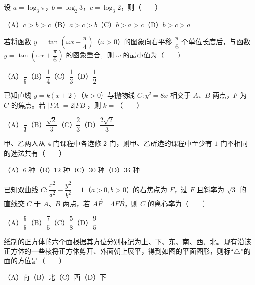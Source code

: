 \begin{question}
设 $a=\log_3\pi$，$b=\log_2 3$，$c=\log_3 2$，则\mbox{（　　）}

（A）$a>b>c$\quad（B）$a>c>b$\quad（C）$b>a>c$\quad（D）$b>c>a$

\end{question}
\begin{question}
若将函数 $y=\tan\left(\omega x+\dfrac\pi4\right)$（$\omega>0$）的图象向右平移 $\dfrac\pi6$ 个单位长度后，与函数 $y=\tan\left(\omega x+\dfrac\pi6\right)$ 的图象重合，则 $\omega$ 的最小值为\mbox{（　　）}

（A）$\dfrac16$\quad（B）$\dfrac14$\quad（C）$\dfrac13$\quad（D）$\dfrac12$

\end{question}
\begin{question}
已知直线 $y=k(x+2)$（$k>0$）与抛物线 $C:y^2=8x$ 相交于 $A\text{、}B$ 两点，$F$ 为 $C$ 的焦点。若 $|FA|=2|FB|$，则 $k=$\mbox{（　　）}

（A）$\dfrac13$\quad（B）$\dfrac{\sqrt2}{3}$\quad（C）$\dfrac23$\quad（D）$\dfrac{2\sqrt2}{3}$

\end{question}
\begin{question}
甲、乙两人从 $4$ 门课程中各选修 $2$ 门，则甲、乙所选的课程中至少有 $1$ 门不相同的选法共有\mbox{（　　）}

（A）$6$ 种\quad（B）$12$ 种\quad（C）$30$ 种\quad（D）$36$ 种

\end{question}
\begin{question}
已知双曲线 $C:\dfrac{x^2}{a^2}-\dfrac{y^2}{b^2}=1$（$a>0,b>0$）的右焦点为 $F$，过 $F$ 且斜率为 $\sqrt3$ 的直线交 $C$ 于 $A\text{、}B$ 两点，若 $\overrightarrow{AF}=4\overrightarrow{FB}$，则 $C$ 的离心率为\mbox{（　　）}

（A）$\dfrac65$\quad（B）$\dfrac75$\quad（C）$\dfrac58$\quad（D）$\dfrac95$

\Needspace{0.4\textheight}
\end{question}
\begin{question}
纸制的正方体的六个面根据其方位分别标记为上、下、东、南、西、北。现有沿该正方体的一些棱将正方体剪开、外面朝上展平，得到如图的平面图形，则标“$\triangle$”的面的方位是\mbox{（　　）}
\nopagebreak[4]
\begin{center}\end{center}
\nopagebreak[4]
（A）南\quad（B）北\quad（C）西\quad（D）下

\end{question}

